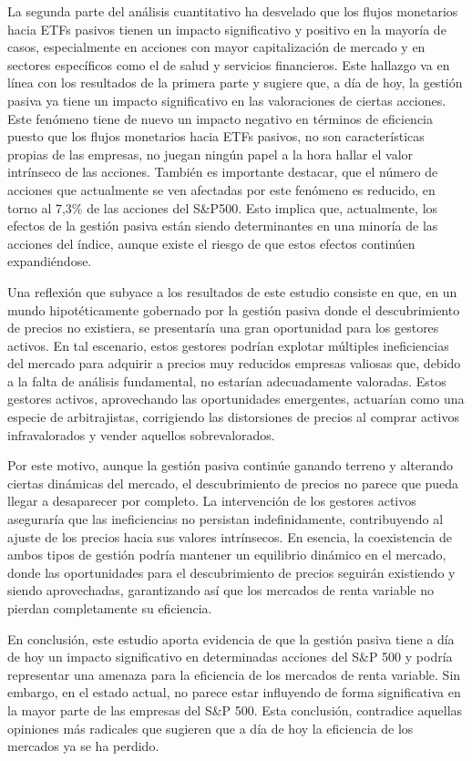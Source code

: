 \documentclass[12pt,a4paper]{article}
\begin{document}
La segunda parte del análisis cuantitativo ha desvelado que los flujos monetarios hacia ETFs pasivos tienen un impacto significativo y positivo en la mayoría de casos, especialmente en acciones con mayor capitalización de mercado y en sectores específicos como el de salud y servicios financieros. Este hallazgo va en línea con los resultados de la primera parte y sugiere que, a día de hoy, la gestión pasiva ya tiene un impacto significativo en las valoraciones de ciertas acciones. Este fenómeno tiene de nuevo un impacto negativo en términos de eficiencia puesto que los flujos monetarios hacia ETFs pasivos, no son características propias de las empresas, no juegan ningún papel a la hora hallar el valor intrínseco de las acciones. También es importante destacar, que el número de acciones que actualmente se ven afectadas por este fenómeno es reducido, en torno al 7,3\% de las acciones del S\&P500. Esto implica que, actualmente, los efectos de la gestión pasiva están siendo determinantes en una minoría de las acciones del índice, aunque existe el riesgo de que estos efectos continúen expandiéndose.

Una reflexión que subyace a los resultados de este estudio consiste en que, en un mundo hipotéticamente gobernado por la gestión pasiva donde el descubrimiento de precios no existiera, se presentaría una gran oportunidad para los gestores activos. En tal escenario, estos gestores podrían explotar múltiples ineficiencias del mercado para adquirir a precios muy reducidos empresas valiosas que, debido a la falta de análisis fundamental, no estarían adecuadamente valoradas. Estos gestores activos, aprovechando las oportunidades emergentes, actuarían como una especie de arbitrajistas, corrigiendo las distorsiones de precios al comprar activos infravalorados y vender aquellos sobrevalorados.

Por este motivo, aunque la gestión pasiva continúe ganando terreno y alterando ciertas dinámicas del mercado, el descubrimiento de precios no parece que pueda llegar a desaparecer por completo. La intervención de los gestores activos aseguraría que las ineficiencias no persistan indefinidamente, contribuyendo al ajuste de los precios hacia sus valores intrínsecos. En esencia, la coexistencia de ambos tipos de gestión podría mantener un equilibrio dinámico en el mercado, donde las oportunidades para el descubrimiento de precios seguirán existiendo y siendo aprovechadas, garantizando así que los mercados de renta variable no pierdan completamente su eficiencia.

En conclusión, este estudio aporta evidencia de que la gestión pasiva tiene a día de hoy un impacto significativo en determinadas acciones del S\&P 500 y podría representar una amenaza para la eficiencia de los mercados de renta variable. Sin embargo, en el estado actual, no parece estar influyendo de forma significativa en la mayor parte de las empresas del S\&P 500. Esta conclusión, contradice aquellas opiniones más radicales que sugieren que a día de hoy la eficiencia de los mercados ya se ha perdido.
\end{document}
